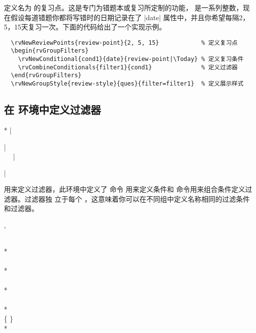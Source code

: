 \documentclass[full]{l3doc}
\begin{document}
\begin{documentation}
\begin{function}{\rvNewReviewPoints}
  定义名为  的复习点。这是专门为错题本或复习所定制的功能，
  是一系列整数，现在假设每道错题你都将写错时的日期记录在了 |date|
  属性中，并且你希望每隔2，5，15天复习一次。下面的代码给出了一个实现示例。
\begin{verbatim}
  \rvNewReviewPoints{review-point}{2, 5, 15}            % 定义复习点
  \begin{rvGroupFilters}
    \rvNewConditional{cond1}{date}{review-point|\Today} % 定义复习条件
    \rvCombineConditionals{filter1}{cond1}              % 定义过滤器
  \end{rvGroupFilters}
  \rvNewGroupStyle{review-style}{ques}{filter=filter1}  % 定义展示样式
\end{verbatim}
\end{function}

\subsection{在  环境中定义过滤器}

\noindent{}
\begin{Syntax}*
  |\begin{rvGroupFilters}| \\
  ~~
  |\end{rvGroupFilters}| \\
\end{Syntax}

用来定义过滤器，此环境中定义了  命令
用来定义条件和  命令用来组合条件定义过滤器。过滤器独
立于每个 ，这意味着你可以在不同组中定义名称相同的过滤条件和过滤器。

\begin{function}{\rvNewConditional, \rvNewConditional*}
  \begin{syntax}
                \\
    *           \\[2pt]
         \\
    *    \\
         \\
    *    \\
          \\
    *     \\
          \{ \textbar{} \} \\
    *     
  \end{syntax}


\end{function}
\end{documentation}
\end{document}
